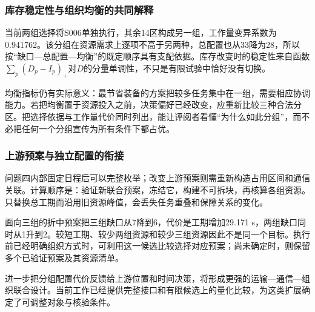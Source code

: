 \subsubsection{库存稳定性与组织均衡的共同解释}
当前两组选择将S006单独执行，其余14区构成另一组，工作量变异系数为0.941762。该分组在资源需求上逐项不高于另两种，总配置也从33降为28，所以按“缺口—总配置—均衡”的既定顺序具有支配依据。库存改变时的稳定性来自函数$\sum_p(D_p-I_p)_+$对$D$的分量单调性，不只是有限试验中恰好没有切换。

均衡指标仍有实际意义：最节省装备的方案把较多任务集中在一组，需要相应协调能力。若把均衡置于资源投入之前，决策偏好已经改变，应重新比较三种合法分区。把选择依据与工作量代价同时列出，能让评阅者看懂“为什么如此分组”，而不必把任何一个分组宣传为所有条件下都占优。

\subsubsection{上游预案与独立配置的衔接}
问题四内部固定日程后可以完整枚举；改变上游预案则需重新构造占用区间和通信关联。计算顺序是：验证新联合预案，冻结它，构建不可拆块，再核算各组资源。只替换总工期而沿用旧资源峰值，会丢失任务重叠和保障关系的变化。

面向三组的折中预案把三组缺口从7降到6，代价是工期增加29.171 s，两组缺口同时从1升到2。较短工期、较少两组资源和较少三组资源因此不是同一个目标。执行前已经明确组织方式时，可利用这一候选比较选择对应预案；尚未确定时，则保留多个已验证预案及其资源清单。

进一步把分组配置代价反馈给上游位置和时间决策，将形成更强的运输—通信—组织联合设计。当前工作已经提供完整接口和有限候选上的量化比较，为这类扩展确定了可调整对象与核验条件。

